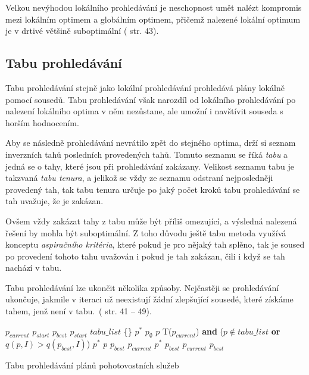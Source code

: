 Velkou nevýhodou lokálního prohledávání je neschopnost umět nalézt kompromis mezi lokálním optimem a globálním optimem,
přičemž nalezené lokální optimum je v drtivé většině suboptimální (\cite{GlovKoch03} str. 43).

\subsection{Tabu prohledávání}

Tabu prohledávání stejně jako lokální prohledávání prohledává plány lokálně pomocí sousedů.
Tabu prohledávání však narozdíl od lokálního prohledávání po nalezení lokálního optima v něm nezůstane,
ale umožní i navštívit souseda s horším hodnocením.

Aby se následně prohledávání nevrátilo zpět do stejného optima,
drží si seznam inverzních tahů posledních provedených tahů. Tomuto seznamu se říká \textit{tabu} a jedná se o tahy, které 
jsou při prohledávání zakázany.
Velikost seznamu tabu je takzvaná \textit{tabu tenura}, a jelikož se vždy ze seznamu odstraní nejposledněji provedený tah,
tak tabu tenura určuje po jaký počet kroků tabu prohledávání se tah uvažuje, že je zakázan. 

Ovšem vždy zakázat tahy z tabu může být příliš omezující, a výsledná nalezená řešení by mohla být suboptimální.
Z toho důvodu ještě tabu metoda využívá konceptu \textit{aspiračního kritéria}, které pokud je pro nějaký tah splěno,
tak je soused po provedení tohoto tahu uvažován i pokud je tah zakázan, čili i když se tah nachází v tabu.

Tabu prohledávání lze ukončit několika způsoby. Nejčastěji se prohledávání ukončuje, jakmile v iteraci už neexistují žádní zlepšující sousedé,
které získáme tahem, jenž není v tabu.~(\cite{GlovKoch03} str. 41 -- 49). 

\begin{algorithm}[H]
  \begin{algorithmic}[1]
    \State $p_{current}$ \gets $p_{start}$
    \State $p_{best}$ \gets $p_{start}$
    \State $tabu\_list$ \gets \{\}
      \State $p^*$ \gets $p_{\emptyset}$ 
        \State $p$ \gets T($p_{current}$)
         \textbf{and} ($p \notin tabu\_list$ \textbf{or} $q(p, I) > q(p_{best}, I)$)
          \State $p^*$ \gets $p$
        \EndIf
      \EndFor
        \State \Return $p_{best}$
      \EndIf
      \State $p_{current}$ \gets $p^*$
        \State $p_{best}$ \gets $p_{current}$
      \EndIf
      \State {}
        \State {} 
      \EndIf
    \EndWhile
    \State \Return $p_{best}$
  \EndFunction
  \end{algorithmic}
  \caption{Tabu prohledávání plánů pohotovostních služeb}
  \label{alg:tabusearch}
\end{algorithm}

